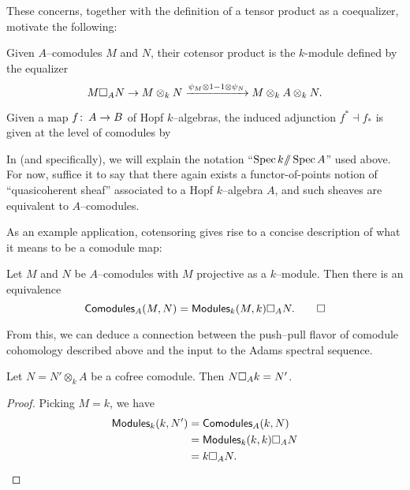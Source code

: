 These concerns, together with the definition of a tensor product as a coequalizer, motivate the following:

\begin{definition}
Given $A$--comodules $M$ and $N$, their cotensor product is the $k$-module defined by the equalizer \[M \square_A N \to M \otimes_k N \xrightarrow{\psi_M \otimes 1 - 1 \otimes \psi_N} M \otimes_k A \otimes_k N.\]
\end{definition}

\begin{lemma}
Given a map $f \colon\thinspace A \to B$ of Hopf $k$--algebras, the induced adjunction $f^* \dashv f_*$ is given at the level of comodules by
\begin{center}
\end{center}
\end{lemma}

\begin{remark}
In  (and  specifically), we will explain the notation ``$\operatorname{Spec} k /\!\!/ \operatorname{Spec} A$'' used above.  For now, suffice it to say that there again exists a functor-of-points notion of ``quasicoherent sheaf'' associated to a Hopf $k$--algebra $A$, and such sheaves are equivalent to $A$--comodules.
\end{remark}

As an example application, cotensoring gives rise to a concise description of what it means to be a comodule map:

\begin{lemma}
Let $M$ and $N$ be $A$--comodules with $M$ projective as a $k$--module.  Then there is an equivalence \[\mathsf{Comodules}_A(M, N) = \mathsf{Modules}_k(M, k) \square_A N. \qed\]
\end{lemma}

\noindent From this, we can deduce a connection between the push--pull flavor of comodule cohomology described above and the input to the Adams spectral sequence.

\begin{corollary}\label{CotensorReducesCofreeness}
Let $N = N' \otimes_k A$ be a cofree comodule. Then $N \square_A k = N'$.
\end{corollary}
\begin{proof}
Picking $M = k$, we have
\begin{align*}
\mathsf{Modules}_k(k, N') & = \mathsf{Comodules}_A(k, N) \\
& = \mathsf{Modules}_k(k, k) \square_A N \\
& = k \square_A N. \qedhere
\end{align*}
\end{proof}

